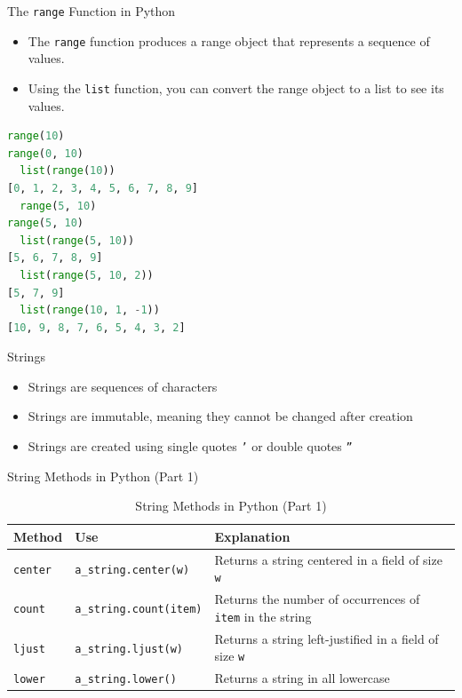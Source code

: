 \begin{frame}[fragile]{The \texttt{range} Function in Python}
    \begin{itemize}
        \item The \texttt{range} function produces a range object that represents a sequence of values.
        \item Using the \texttt{list} function, you can convert the range object to a list to see its values.
    \end{itemize}
    \begin{lstlisting}[language=Python]
  range(10)
range(0, 10)
  list(range(10))
[0, 1, 2, 3, 4, 5, 6, 7, 8, 9]
  range(5, 10)
range(5, 10)
  list(range(5, 10))
[5, 6, 7, 8, 9]
  list(range(5, 10, 2))
[5, 7, 9]
  list(range(10, 1, -1))
[10, 9, 8, 7, 6, 5, 4, 3, 2]
    \end{lstlisting}
\end{frame}

\begin{frame}{Strings}
    \begin{itemize}
        \item Strings are sequences of characters
        \item Strings are immutable, meaning they cannot be changed after creation
        \item Strings are created using single quotes \texttt{'} or double quotes \texttt{''}
    \end{itemize}
\end{frame}     

\begin{frame}{String Methods in Python (Part 1)}
    \begin{table}[]
        \centering
        \begin{tabular}{|l|l|p{5cm}|}
            \hline
            \textbf{Method} & \textbf{Use} & \textbf{Explanation} \\ \hline
            \texttt{center} & \texttt{a\_string.center(w)} & Returns a string centered in a field of size \texttt{w} \\ \hline
            \texttt{count} & \texttt{a\_string.count(item)} & Returns the number of occurrences of \texttt{item} in the string \\ \hline
            \texttt{ljust} & \texttt{a\_string.ljust(w)} & Returns a string left-justified in a field of size \texttt{w} \\ \hline
            \texttt{lower} & \texttt{a\_string.lower()} & Returns a string in all lowercase \\ \hline
        \end{tabular}
        \caption{String Methods in Python (Part 1)}
    \end{table}
\end{frame}

